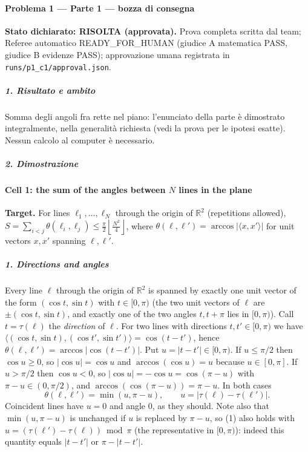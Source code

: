 \documentclass[11pt,a4paper]{article}
\begin{document}
\paragraph{Problema 1 --- Parte 1 --- bozza di
consegna}\label{problema-1-parte-1-bozza-di-consegna}

\textbf{Stato dichiarato: RISOLTA (approvata).} Prova completa scritta
dal team; Referee automatico READY\_FOR\_HUMAN (giudice A matematica
PASS, giudice B evidenze PASS); approvazione umana registrata in
\texttt{runs/p1\_c1/approval.json}.

\subparagraph{1. Risultato e ambito}\label{risultato-e-ambito}

Somma degli angoli fra rette nel piano: l'enunciato della parte è
dimostrato integralmente, nella generalità richiesta (vedi la prova per
le ipotesi esatte). Nessun calcolo al computer è necessario.

\subparagraph{2. Dimostrazione}\label{dimostrazione}

\paragraph{\texorpdfstring{Cell 1: the sum of the angles between \(N\)
lines in the
plane}{Cell 1: the sum of the angles between N lines in the plane}}\label{cell-1-the-sum-of-the-angles-between-n-lines-in-the-plane}

\textbf{Target.} For lines \(\ell_1,\dots,\ell_N\) through the origin of
\(\mathbb R^2\) (repetitions allowed),
\(S=\sum_{i<j}\theta(\ell_i,\ell_j)\le \frac{\pi}{2}\left\lfloor \frac{N^2}{4}\right\rfloor\),
where \(\theta(\ell,\ell')=\arccos|\langle x,x'\rangle|\) for unit
vectors \(x,x'\) spanning \(\ell,\ell'\).

\subparagraph{1. Directions and angles}\label{directions-and-angles}

Every line \(\ell\) through the origin of \(\mathbb R^2\) is spanned by
exactly one unit vector of the form \((\cos t,\sin t)\) with
\(t\in[0,\pi)\) (the two unit vectors of \(\ell\) are
\(\pm(\cos t,\sin t)\), and exactly one of the two angles \(t,t+\pi\)
lies in \([0,\pi)\)). Call \(t=\tau(\ell)\) the \emph{direction} of
\(\ell\). For two lines with directions \(t,t'\in[0,\pi)\) we have
\(\langle(\cos t,\sin t),(\cos t',\sin t')\rangle=\cos(t-t')\), hence
\(\theta(\ell,\ell')=\arccos|\cos(t-t')|\). Put \(u=|t-t'|\in[0,\pi)\).
If \(u\le\pi/2\) then \(\cos u\ge 0\), so \(|\cos u|=\cos u\) and
\(\arccos(\cos u)=u\) because \(u\in[0,\pi]\). If \(u>\pi/2\) then
\(\cos u<0\), so \(|\cos u|=-\cos u=\cos(\pi-u)\) with
\(\pi-u\in(0,\pi/2)\), and \(\arccos(\cos(\pi-u))=\pi-u\). In both cases
\[\theta(\ell,\ell')=\min(u,\pi-u),\qquad u=|\tau(\ell)-\tau(\ell')|.\tag{1}\]
Coincident lines have \(u=0\) and angle \(0\), as they should. Note also
that \(\min(u,\pi-u)\) is unchanged if \(u\) is replaced by \(\pi-u\),
so (1) also holds with \(u=(\tau(\ell')-\tau(\ell))\bmod\pi\) (the
representative in \([0,\pi)\)): indeed this quantity equals \(|t-t'|\)
or \(\pi-|t-t'|\).
\end{document}
